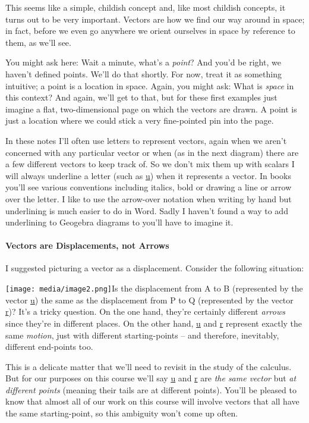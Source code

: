 \documentclass[oneside,english]{amsbook}
\numberwithin{section}{chapter}
\theoremstyle{plain}
\theoremstyle{definition}
\begin{document}
This seems like a simple, childish concept and, like most childish
concepts, it turns out to be very important. Vectors are how we find our
way around in space; in fact, before we even go anywhere we orient
ourselves in space by reference to them, as we'll see.

You might ask here: Wait a minute, what's a \emph{point}? And you'd be
right, we haven't defined points. We'll do that shortly. For now, treat
it as something intuitive; a point is a location in space. Again, you
might ask: What is \emph{space} in this context? And again, we'll get to
that, but for these first examples just imagine a flat, two-dimensional
page on which the vectors are drawn. A point is just a location where we
could stick a very fine-pointed pin into the page.

In these notes I'll often use letters to represent vectors, again when
we aren't concerned with any particular vector or when (as in the next
diagram) there are a few different vectors to keep track of. So we don't
mix them up with scalars I will always underline a letter (such as
\ul{u}) when it represents a vector. In books you'll see various
conventions including italics, bold or drawing a line or arrow over the
letter. I like to use the arrow-over notation when writing by hand but
underlining is much easier to do in Word. Sadly I haven't found a way to
add underlining to Geogebra diagrams to you'll have to imagine it.

\paragraph{Vectors are Displacements, not Arrows}

I suggested picturing a vector as a displacement. Consider the following
situation:

\texttt{[image: media/image2.png]}Is
the displacement from A to B (represented by the vector \ul{u}) the same
as the displacement from P to Q (represented by the vector \ul{r})? It's
a tricky question. On the one hand, they're certainly different
\emph{arrows} since they're in different places. On the other hand,
\ul{u} and \ul{r} represent exactly the same \emph{motion}, just with
different starting-points -- and therefore, inevitably, different
end-points too.

This is a delicate matter that we'll need to revisit in the study of the
calculus. But for our purposes on this course we'll say \ul{u} and
\ul{r} are \emph{the same vector} but \emph{at different points}
(meaning their tails are at different points). You'll be pleased to know
that almost all of our work on this course will involve vectors that all
have the same starting-point, so this ambiguity won't come up often.
\end{document}
